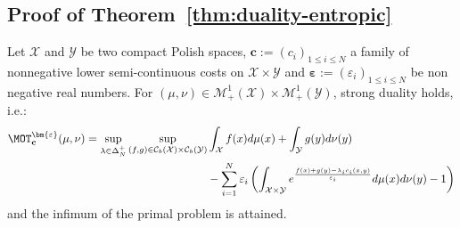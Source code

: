 \subsection{Proof of Theorem~\ref{thm:duality-entropic}}
\begin{thm*}
Let $\mathcal{X}$ and $\mathcal{Y}$ be two compact Polish spaces, $\mathbf{c}:=(c_i)_{1\leq i\leq N}$ a family of nonnegative lower semi-continuous costs on $\mathcal{X}\times\mathcal{Y}$ and $\bm{\varepsilon}:=(\varepsilon_i)_{1\leq i\leq N}$ be non negative real numbers. For $(\mu,\nu)\in\mathcal{M}_+^{1}(\mathcal{X})\times\mathcal{M}_+^{1}(\mathcal{Y})$, strong duality holds, i.e.:
\begin{align*}
    \MOT_{\mathbf{c}}^{\bm{\varepsilon}}(\mu,\nu)=\sup_{\lambda\in\Delta_N^{+}} \sup_{(f,g)\in\mathcal{C}_b(\mathcal{X})\times\mathcal{C}_b(\mathcal{Y})} &\int_{\mathcal{X}} f(x)d\mu(x)+ \int_{\mathcal{Y}} g(y)d\nu(y)\\
 &-\sum_{i=1}^N\varepsilon_i\left( \int_{\mathcal{X}\times\mathcal{Y}} e^{\frac{f(x)+g(y)-\lambda_ic_i(x,y)}{\varepsilon_i}} d\mu(x)d\nu(y)-1\right)
\end{align*}
and the infimum of the primal problem is attained.
\end{thm*}
